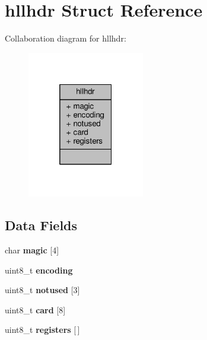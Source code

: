 \hypertarget{structhllhdr}{}\section{hllhdr Struct Reference}
\label{structhllhdr}


Collaboration diagram for hllhdr\+:\nopagebreak
\begin{figure}[H]
\begin{center}
\leavevmode
\includegraphics[width=145pt]{structhllhdr__coll__graph}
\end{center}
\end{figure}
\subsection*{Data Fields}
\begin{DoxyCompactItemize}
\item 
\mbox{\label{structhllhdr_a0a101e2637165bfa83dcca6a6ac48b7f}} 
char {\bfseries magic} \mbox{[}4\mbox{]}
\item 
\mbox{\label{structhllhdr_ac5f5494006e3355919ef709c90d67887}} 
uint8\+\_\+t {\bfseries encoding}
\item 
\mbox{\label{structhllhdr_a9354341df226d8c3a7f7e6cee89fd1dc}} 
uint8\+\_\+t {\bfseries notused} \mbox{[}3\mbox{]}
\item 
\mbox{\label{structhllhdr_add0044c832d74626e0e34d5743b20022}} 
uint8\+\_\+t {\bfseries card} \mbox{[}8\mbox{]}
\item 
\mbox{\label{structhllhdr_a29e29f4222106a56dd578e68a1d079f3}} 
uint8\+\_\+t {\bfseries registers} \mbox{[}$\,$\mbox{]}
\end{DoxyCompactItemize}


